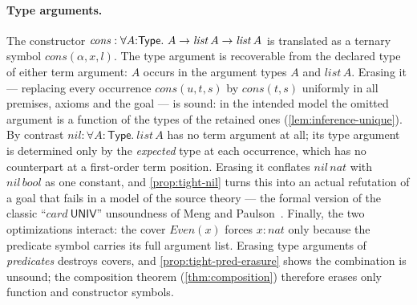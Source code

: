 \paragraph{Type arguments.}
The constructor $\mathit{cons} : \forall A{:}\mathsf{Type}.\ A \rightarrow
\mathit{list}\,A \rightarrow \mathit{list}\,A$ is translated as a ternary symbol
$\mathit{cons}(\alpha,x,l)$.  The type argument is recoverable from the
declared type of either term argument: $A$ occurs in the argument types $A$
and $\mathit{list}\,A$.  Erasing it --- replacing every occurrence
$\mathit{cons}(u,t,s)$ by $\mathit{cons}(t,s)$ uniformly in all premises,
axioms and the goal --- is sound: in the intended model the omitted argument
is a function of the types of the retained ones (\cref{lem:inference-unique}).
By contrast $\mathit{nil} : \forall A{:}\mathsf{Type}.\ \mathit{list}\,A$
has no term argument at all; its type argument is determined only by the
\emph{expected} type at each occurrence, which has no counterpart at a
first-order term position.  Erasing it conflates $\mathit{nil}\,\mathit{nat}$
with $\mathit{nil}\,\mathit{bool}$ as one constant, and
\cref{prop:tight-nil} turns this into an actual refutation of a goal that
fails in a model of the source theory --- the formal version of the classic
``$\mathit{card}\ \mathsf{UNIV}$'' unsoundness of
Meng and Paulson~\cite{MengPaulson2008}.  Finally, the two optimizations
interact: the cover $\mathit{Even}(x)$ forces $x : \mathit{nat}$ only
because the predicate symbol carries its full argument list.  Erasing type
arguments of \emph{predicates} destroys covers, and
\cref{prop:tight-pred-erasure} shows the combination is unsound; the
composition theorem (\cref{thm:composition}) therefore erases only function
and constructor symbols.

